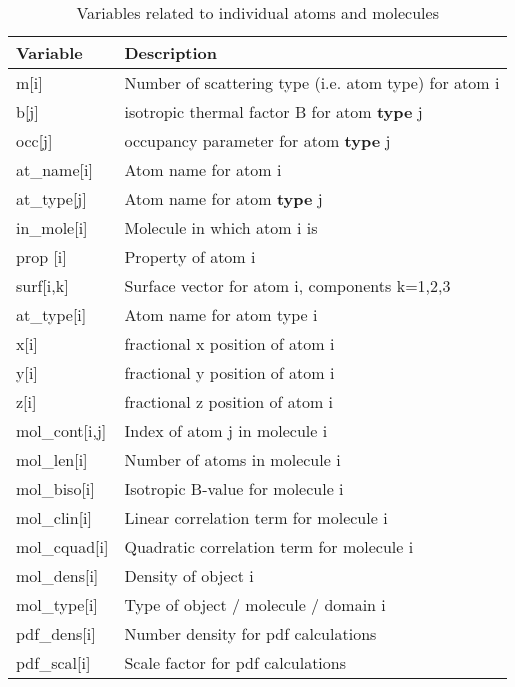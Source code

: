 \begin{table}[!tbh]
\centering
\begin{tabularx}{\textwidth}{|p{30mm}|X|}
  \hline
  {\bf Variable} & {\bf Description} \\
  \hline\hline
  m[i]   & Number of scattering type (i.e. atom type) for atom i \\
  b[j]   & isotropic thermal factor B for atom {\bf type} j \\
  occ[j]   & occupancy parameter for atom {\bf type} j \\
  at\_name[i] & Atom name for atom i\\
  at\_type[j] & Atom name for atom {\bf type} j\\
  in\_mole[i] & Molecule in which atom i is \\
  prop    [i] & Property of atom i \\
  surf[i,k]   & Surface vector for atom i, components k=1,2,3\\
  \hline
  at\_type[i] & Atom name for atom type i\\
  \hline
  x[i]   & fractional x position of atom i \\
  y[i]   & fractional y position of atom i \\ 
  z[i]   & fractional z position of atom i \\
  \hline\hline
  mol\_cont[i,j] & Index of atom j in molecule i \\
  mol\_len[i]    & Number of atoms in molecule i \\
  mol\_biso[i]   & Isotropic B-value for molecule i\\
  mol\_clin[i]   & Linear correlation term for molecule i \\
  mol\_cquad[i]  & Quadratic correlation term for molecule i \\
  mol\_dens[i]   & Density of object i \\
  mol\_type[i]   & Type of object / molecule / domain i \\ 
  \hline\hline
  pdf\_dens[i]   & Number density for pdf calculations \\
  pdf\_scal[i]   & Scale factor   for pdf calculations \\
  \hline
\end{tabularx}
\caption{\label{v2-tab}Variables related to individual atoms and
         molecules}
\end{table}

